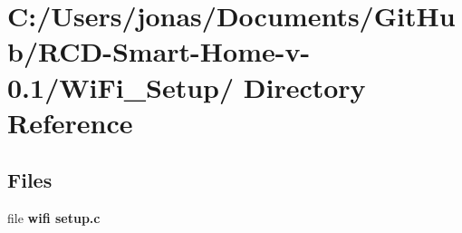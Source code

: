 \section{C:/Users/jonas/Documents/Git\-Hub/RCD-Smart-Home-v-0.1/Wi\-Fi\_\-Setup/ Directory Reference}
\label{dir_C_3A_2FUsers_2Fjonas_2FDocuments_2FGitHub_2FRCD_2DSmart_2DHome_2Dv_2D0_2E1_2FWiFi_5FSetup_2F}


\subsection*{Files}
\begin{CompactItemize}
\item 
file {\bf wifi setup.c}
\end{CompactItemize}
